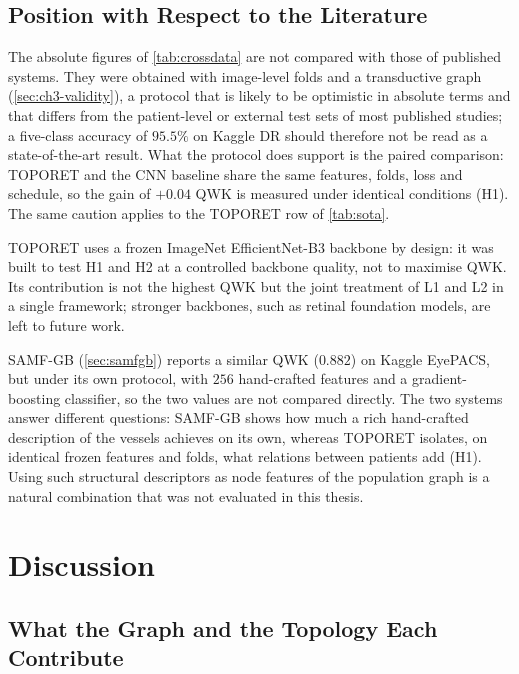\subsection{Position with Respect to the Literature}
\label{sec:toporet-sota}

The absolute figures of \cref{tab:crossdata} are not compared with those of published
systems. They were obtained with image-level folds and a transductive graph
(\cref{sec:ch3-validity}), a protocol that is likely to be optimistic in absolute terms and
that differs from the patient-level or external test sets of most published studies; a
five-class accuracy of $95.5\%$ on Kaggle DR should therefore not be read as a
state-of-the-art result. What the protocol does support is the paired comparison:
TOPORET and the CNN baseline share the same features, folds, loss and schedule, so the
gain of $+0.04$ QWK is measured under identical conditions (H1). The same caution applies
to the TOPORET row of \cref{tab:sota}.

TOPORET uses a frozen ImageNet EfficientNet-B3 backbone by design: it was built to test H1
and H2 at a controlled backbone quality, not to maximise QWK. Its contribution is not the
highest QWK but the joint treatment of L1 and L2 in a single framework; stronger
backbones, such as retinal foundation models, are left to future work.

SAMF-GB (\cref{sec:samfgb}) reports a similar QWK ($0.882$) on Kaggle EyePACS, but under
its own protocol, with $256$ hand-crafted features and a gradient-boosting classifier, so
the two values are not compared directly. The two systems answer different questions:
SAMF-GB shows how much a rich hand-crafted description of the vessels achieves on its
own, whereas TOPORET isolates, on identical frozen features and folds, what relations
between patients add (H1). Using such structural descriptors as node features of the
population graph is a natural combination that was not evaluated in this thesis.

\section{Discussion}
\label{sec:ch3-discussion}

\subsection{What the Graph and the Topology Each Contribute}
\label{sec:dualnecessary}

